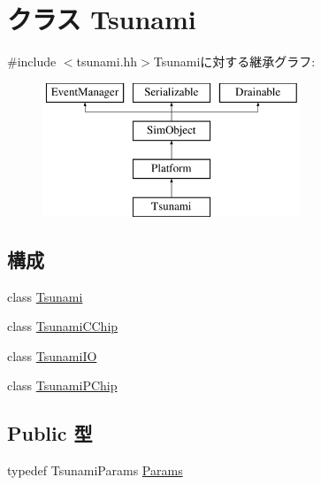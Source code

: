 \hypertarget{classTsunami}{
\section{クラス Tsunami}
\label{classTsunami}
}


{\ttfamily \#include $<$tsunami.hh$>$}Tsunamiに対する継承グラフ:\begin{figure}[H]
\begin{center}
\leavevmode
\includegraphics[height=4cm]{classTsunami}
\end{center}
\end{figure}
\subsection*{構成}
\begin{DoxyCompactItemize}
\item 
class \hyperlink{classTsunami_1_1Tsunami}{Tsunami}
\item 
class \hyperlink{classTsunami_1_1TsunamiCChip}{TsunamiCChip}
\item 
class \hyperlink{classTsunami_1_1TsunamiIO}{TsunamiIO}
\item 
class \hyperlink{classTsunami_1_1TsunamiPChip}{TsunamiPChip}
\end{DoxyCompactItemize}
\subsection*{Public 型}
\begin{DoxyCompactItemize}
\item 
typedef TsunamiParams \hyperlink{classTsunami_a7beeeed12982def83e22faf17f7385e1}{Params}
\end{DoxyCompactItemize}
